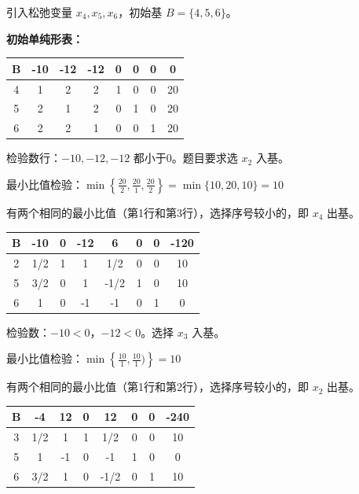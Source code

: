 \documentclass[12pt,a4paper]{article}
\begin{document}
引入松弛变量 $x_4, x_5, x_6$，初始基 $B = \{4, 5, 6\}$。

\textbf{初始单纯形表：}

\begin{table}[h]
\centering
\begin{tabular}{|c|cccccc|c|}
\hline
B & -10 & -12 & -12 & 0 & 0 & 0 & 0 \\
\hline
4 & 1 & 2 & 2 & 1 & 0 & 0 & 20 \\
5 & 2 & 1 & 2 & 0 & 1 & 0 & 20 \\
6 & 2 & 2 & 1 & 0 & 0 & 1 & 20 \\
\hline
\end{tabular}
\end{table}

检验数行：$-10, -12, -12$ 都小于0。题目要求选 $x_2$ 入基。

最小比值检验：$\min\left\{\frac{20}{2}, \frac{20}{1}, \frac{20}{2}\right\} = \min\{10, 20, 10\} = 10$

有两个相同的最小比值（第1行和第3行），选择序号较小的，即 $x_4$ 出基。




\begin{table}[h]
\centering
\begin{tabular}{|c|cccccc|c|}
\hline
B & -10 & 0 & -12 & 6 & 0 & 0 & -120 \\
\hline
2 & 1/2 & 1 & 1 & 1/2 & 0 & 0 & 10 \\
5 & 3/2 & 0 & 1 & -1/2 & 1 & 0 & 10 \\
6 & 1 & 0 & -1 & -1 & 0 & 1 & 0 \\
\hline
\end{tabular}
\end{table}

检验数：$-10 < 0$，$-12 < 0$。选择 $x_3$ 入基。

最小比值检验：$\min\left\{\frac{10}{1}, \frac{10}{1})\right\} = 10$

有两个相同的最小比值（第1行和第2行），选择序号较小的，即 $x_2$ 出基。



\begin{table}[h]
\centering
\begin{tabular}{|c|cccccc|c|}
\hline
B & -4 & 12 & 0 & 12 & 0 & 0 & -240 \\
\hline
3 & 1/2 & 1 & 1 & 1/2 & 0 & 0 & 10 \\
5 & 1 & -1 & 0 & -1 & 1 & 0 & 0 \\
6 & 3/2 & 1 & 0 & -1/2 & 0 & 1 & 10 \\
\hline
\end{tabular}
\end{table}
\end{document}
